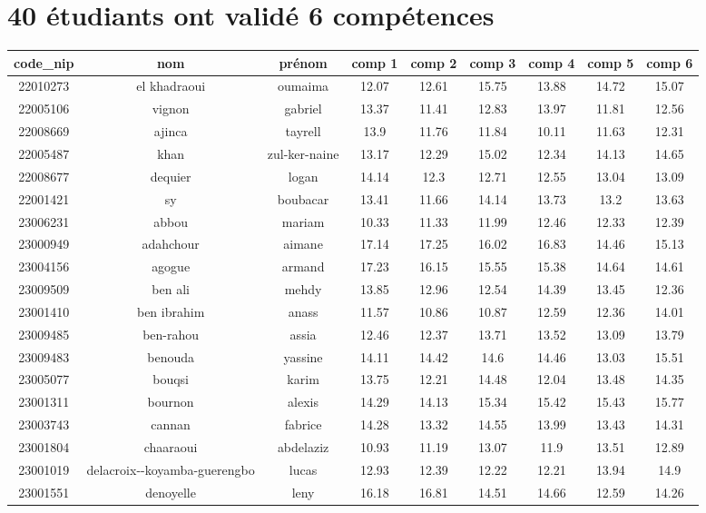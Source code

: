 \documentclass{article}%
\begin{document}
%
\normalsize%
\section{40 étudiants ont validé 6 compétences}%
\label{sec:40tudiantsontvalid6comptences}%
\begin{tabular}{|c|c|c|c|c|c|c|c|c|}%
\hline%
code\_nip&nom&prénom&comp 1&comp 2&comp 3&comp 4&comp 5&comp 6\\%
\hline%
22010273&el khadraoui&oumaima&12.07&12.61&15.75&13.88&14.72&15.07\\%
\hline%
22005106&vignon&gabriel&13.37&11.41&12.83&13.97&11.81&12.56\\%
\hline%
22008669&ajinca&tayrell&13.9&11.76&11.84&10.11&11.63&12.31\\%
\hline%
22005487&khan&zul{-}ker{-}naine&13.17&12.29&15.02&12.34&14.13&14.65\\%
\hline%
22008677&dequier&logan&14.14&12.3&12.71&12.55&13.04&13.09\\%
\hline%
22001421&sy&boubacar&13.41&11.66&14.14&13.73&13.2&13.63\\%
\hline%
23006231&abbou&mariam&10.33&11.33&11.99&12.46&12.33&12.39\\%
\hline%
23000949&adahchour&aimane&17.14&17.25&16.02&16.83&14.46&15.13\\%
\hline%
23004156&agogue&armand&17.23&16.15&15.55&15.38&14.64&14.61\\%
\hline%
23009509&ben ali&mehdy&13.85&12.96&12.54&14.39&13.45&12.36\\%
\hline%
23001410&ben ibrahim&anass&11.57&10.86&10.87&12.59&12.36&14.01\\%
\hline%
23009485&ben{-}rahou&assia&12.46&12.37&13.71&13.52&13.09&13.79\\%
\hline%
23009483&benouda&yassine&14.11&14.42&14.6&14.46&13.03&15.51\\%
\hline%
23005077&bouqsi&karim&13.75&12.21&14.48&12.04&13.48&14.35\\%
\hline%
23001311&bournon&alexis&14.29&14.13&15.34&15.42&15.43&15.77\\%
\hline%
23003743&cannan&fabrice&14.28&13.32&14.55&13.99&13.43&14.31\\%
\hline%
23001804&chaaraoui&abdelaziz&10.93&11.19&13.07&11.9&13.51&12.89\\%
\hline%
23001019&delacroix{-}{-}koyamba{-}guerengbo&lucas&12.93&12.39&12.22&12.21&13.94&14.9\\%
\hline%
23001551&denoyelle&leny&16.18&16.81&14.51&14.66&12.59&14.26\\%

\end{tabular}
\end{document}
